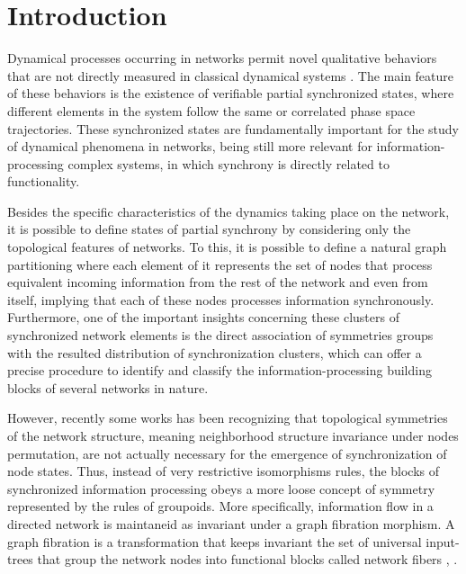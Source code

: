 \documentclass[12pt]{diazessay} %
\begin{document}



\vspace{30pt} %


\section{Introduction}

Dynamical processes occurring in networks permit novel qualitative behaviors that are not directly measured in classical dynamical systems \cite{Stewart2006}. The main feature of these behaviors is the existence of verifiable partial synchronized states, where different elements in the system follow the same or correlated phase space trajectories. These synchronized states are fundamentally important for the study of dynamical phenomena in networks, being still more relevant for information-processing complex systems, in which synchrony is directly related to functionality.

Besides the specific characteristics of the dynamics taking place on the network, it is possible to define states of partial synchrony by considering only the topological features of networks. To this, it is possible to define a natural graph partitioning where each element of it represents the set of nodes that process equivalent incoming information from the rest of the network and even from itself, implying that each of these nodes processes information synchronously.  Furthermore, one of the important insights concerning these clusters of synchronized network elements is the direct association of symmetries groups with the resulted distribution of synchronization clusters, which can offer a precise procedure to identify and classify the information-processing building blocks of several networks in nature.

However, recently some works has been recognizing that topological symmetries of the network structure, meaning neighborhood structure invariance under nodes permutation, are not actually necessary for the emergence of synchronization of node states. Thus, instead of very restrictive isomorphisms rules, the blocks of synchronized information processing obeys a more loose concept of symmetry represented by the rules of groupoids. More specifically, information flow in a directed network is maintaneid as invariant under a graph fibration morphism. A graph fibration is a transformation that keeps invariant the set of universal input-trees that group the network nodes into functional blocks called network fibers \cite{Boldi2006}, \cite{fibration2019}.
\end{document}
